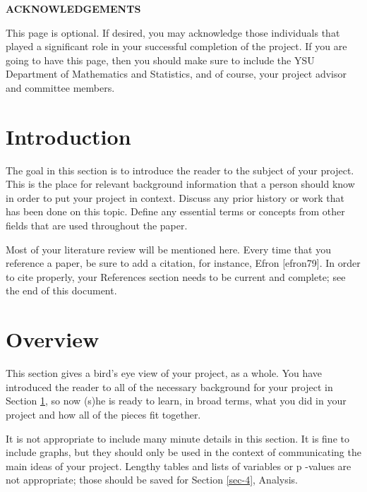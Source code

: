 \documentclass[11pt]{article}
\begin{document}
\newpage
\begin{center}
\textbf{ACKNOWLEDGEMENTS} 
\end{center} \vspace{0.25in}

This page is optional. If desired, you may acknowledge those 
individuals that played a significant role in your successful 
completion of the project. If you are going to have this page, 
then you should make sure to include the YSU Department of 
Mathematics and Statistics, and of course, your project advisor 
and committee members.

\newpage
\tableofcontents

\newpage
\section[Introduction]{Introduction}
\label{sec-1}

The goal in this section is to introduce the reader to the subject of
your project. This is the place for relevant background information
that a person should know in order to put your project in
context. Discuss any prior history or work that has been done on this
topic. Define any essential terms or concepts from other fields that
are used throughout the paper.

Most of your literature review will be mentioned here. Every time that
you reference a paper, be sure to add a citation, for instance, Efron
[efron79]. In order to cite properly, your References section needs to
be current and complete; see the end of this document.

\newpage

\section[Overview]{Overview}
\label{sec-2}

This section gives a bird's eye view of your project, as a whole.  You
have introduced the reader to all of the necessary background for your
project in Section \ref{sec-1}, so now (s)he is ready to learn,
in broad terms, what you did in your project and how all of the pieces
fit together.

It is not appropriate to include many minute details in this
section. It is fine to include graphs, but they should only be used in
the context of communicating the main ideas of your project. Lengthy
tables and lists of variables or p -values are not appropriate; those
should be saved for Section \ref{sec-4}, Analysis.
\end{document}
